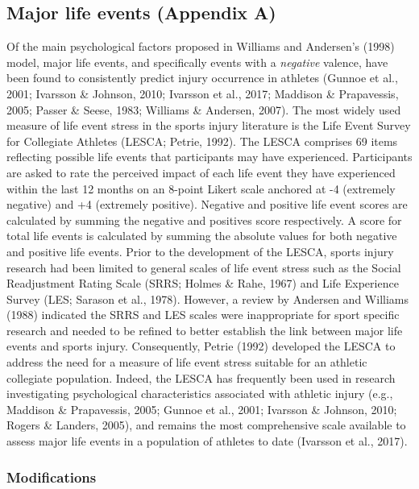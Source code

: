 \documentclass[man,floatsintext]{apa6}
\begin{document}
\hypertarget{major-life-events-appendix-a}{%
\subsection{Major life events (Appendix A)}\label{major-life-events-appendix-a}}

Of the main psychological factors proposed in Williams and Andersen's (1998) model, major life events, and specifically events with a \emph{negative} valence, have been found to consistently predict injury occurrence in athletes (Gunnoe et al., 2001; Ivarsson \& Johnson, 2010; Ivarsson et al., 2017; Maddison \& Prapavessis, 2005; Passer \& Seese, 1983; Williams \& Andersen, 2007).
The most widely used measure of life event stress in the sports injury literature is the Life Event Survey for Collegiate Athletes (LESCA; Petrie, 1992).
The LESCA comprises 69 items reflecting possible life events that participants may have experienced.
Participants are asked to rate the perceived impact of each life event they have experienced within the last 12 months on an 8-point Likert scale anchored at -4 (extremely negative) and +4 (extremely positive).
Negative and positive life event scores are calculated by summing the negative and positives score respectively.
A score for total life events is calculated by summing the absolute values for both negative and positive life events.
Prior to the development of the LESCA, sports injury research had been limited to general scales of life event stress such as the Social Readjustment Rating Scale (SRRS; Holmes \& Rahe, 1967) and Life Experience Survey (LES; Sarason et al., 1978).
However, a review by Andersen and Williams (1988) indicated the SRRS and LES scales were inappropriate for sport specific research and needed to be refined to better establish the link between major life events and sports injury.
Consequently, Petrie (1992) developed the LESCA to address the need for a measure of life event stress suitable for an athletic collegiate population.
Indeed, the LESCA has frequently been used in research investigating psychological characteristics associated with athletic injury (e.g., Maddison \& Prapavessis, 2005; Gunnoe et al., 2001; Ivarsson \& Johnson, 2010; Rogers \& Landers, 2005), and remains the most comprehensive scale available to assess major life events in a population of athletes to date (Ivarsson et al., 2017).

\hypertarget{modifications}{%
\subsubsection{Modifications}\label{modifications}}
\end{document}
